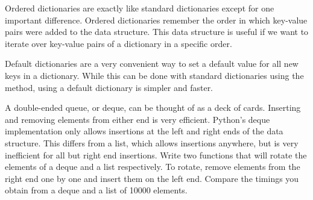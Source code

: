 Ordered dictionaries are exactly like standard dictionaries except for one important difference.
Ordered dictionaries remember the order in which key-value pairs were added to the data structure.
This data structure is useful if we want to iterate over key-value pairs of a dictionary in a specific order.

Default dictionaries are a very convenient way to set a default value for all new keys in a dictionary.
While this can be done with standard dictionaries using the  method, using a default dictionary is simpler and faster.

\begin{problem}
A double-ended queue, or deque, can be thought of as a deck of cards.
Inserting and removing elements from either end is very efficient.
Python's deque implementation only allows insertions at the left and right ends of the data structure.
This differs from a list, which allows insertions anywhere, but is very inefficient for all but right end insertions.
Write two functions that will rotate the elements of a deque and a list respectively.
To rotate, remove elements from the right end one by one and insert them on the left end.
Compare the timings you obtain from a deque and a list of 10000 elements.
\end{problem}
